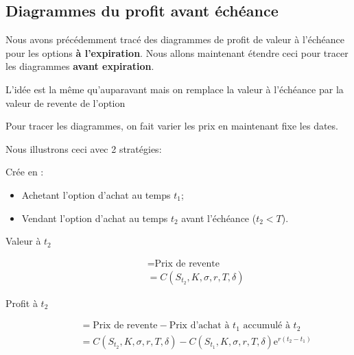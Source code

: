 \documentclass[10pt, french]{article}
\begin{document}
\begin{multicols*}{2}



\columnbreak

\subsection*{Diagrammes du profit avant échéance}
Nous avons précédemment tracé des diagrammes de profit de valeur à l'échéance pour les options \textbf{à l'expiration}. Nous allons maintenant étendre ceci pour tracer les diagrammes \textbf{avant expiration}.

L'idée est la même qu'auparavant mais on remplace la valeur à l'échéance par la valeur de revente de l'option

Pour tracer les diagrammes, on fait varier les prix en maintenant fixe les dates.

Nous illustrons ceci avec 2 stratégies:

\begin{definitionNOHFILL}
Crée en :
\begin{itemize}[leftmargin = *]
	\item	Achetant l'option d'achat au temps $t_{1}$;
	\item	Vendant l'option d'achat au temps $t_{2}$ avant l'échéance ($t_{2} < T$).
\end{itemize}

\begin{description}
	\item[Valeur à $t_{2}$]	
		\begin{align*}
		&=	\text{Prix de revente}	\\
		&=	C(S_{t_{2}}, K, \sigma, r, T, \delta)
		\end{align*}
	\item[Profit à $t_{2}$]	
		\begin{align*}
		&=	\text{Prix de revente} - \text{Prix d'achat à $t_{1}$ accumulé à $t_{2}$}	\\
		&=	C(S_{t_{2}}, K, \sigma, r, T, \delta) - C(S_{t_{1}}, K, \sigma, r, T, \delta) \textrm{e}^{r(t_{2} - t_{1})}
		\end{align*}
\end{description}
\end{definitionNOHFILL}


\end{multicols*}
\end{document}

